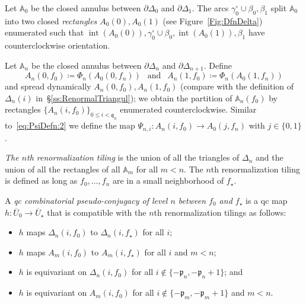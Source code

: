 \documentclass[]{amsart}
\renewcommand{\sp}{{\ \ }}
\newcommand{\bDelta}{{\mathbb{\Delta}}}
\newcommand{\bA}{{\mathbb{A}}}
\newcommand\intr{\operatorname{int}}
\newcommand{\str}{{\star}}
\newcommand{\pp}{\mathfrak{p}}
\renewcommand{\qq}{\mathfrak{q}}
\theoremstyle{remark}
\numberwithin{equation}{section}
\theoremstyle{definition}
\begin{document}
 Let $\bA_0$ be the closed annulus between $\partial \bDelta_0$  and $\partial  \bDelta_1$. The arcs $\gamma^\circ_0\cup \beta_0,\beta_1$ split $\bA_0$ into two closed \emph{rectangles $A_0(0), A_0(1)$} (see Figure~\ref{Fig:DfnDelta}) enumerated such that  $\intr(A_0(0)),\gamma_0^\circ \cup \beta_0, \intr( A_0(1)), \beta_1$ have counterclockwise orientation. 



Let $\bA_n$ be the closed annulus between $\partial \bDelta_n$ and $\partial \bDelta_{n+1}$. Define \[A_n(0,f_0)\coloneqq \Phi_n(A_0(0,f_n))\sp\text{ and }\sp  A_n(1,f_0)\coloneqq \Phi_n(A_0(1,f_n))\] and spread dynamically $A_n(0,f_0),A_n(1,f_0)$ (compare with the definition of $\Delta_n(i)$ in~\S\ref{ss:RenormalTriangul}); we obtain the partition of $\bA_n(f_0)$ by rectangles $\{A_n(i,f_0)\}_{0\le i<\qq_n}
$ enumerated counterclockwise. Similar to~\eqref{eq:PsiDefn:2} we define the map $ \Psi_{n,i}\colon A_n(i,f_0)\to A_0(j,f_n)$ with $j\in \{0,1\}$.

\emph{The $n$th renormalization tiling} is the union of all the triangles of $\bDelta_{n}$ and the union of all the rectangles of all $\bA_m$ for all $m<n$. The $n$th renormalization tiling is defined as long as $f_0,\dots, f_n$ are in a small neighborhood of $f_\str$.



A \emph{qc combinatorial pseudo-conjugacy of level $n$ between $f_0$ and $f_\str$} is a qc map $h\colon \overline U_{0}\to \overline U_{\str}$ that is compatible with the $n$th renormalization tilings as follows:

\begin{itemize}
\item $h$ maps $\Delta_n(i,f_0)$ to $\Delta_n(i,f_\str)$ for all $i$;
\item $h$ maps $A_m(i,f_0)$ to $A_m(i,f_\str)$ for all $i$ and $m<n$;
\item $h$ is equivariant on $ \Delta_n(i,f_0)$ for all $i\not \in \{-\pp_n, -\pp_n+1\}$; and
\item  $h$ is equivariant on $A_m(i,f_0)$ for all $i\not \in \{-\pp_m, -\pp_m+1\}$ and $m<n$.
\end{itemize}
\end{document}
